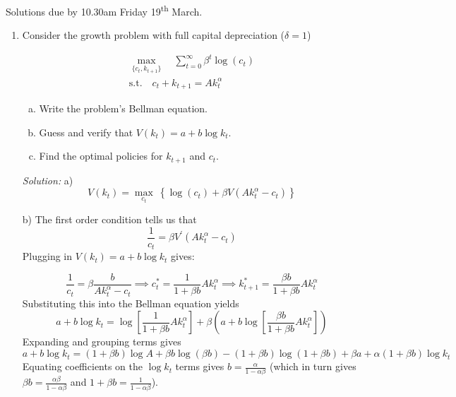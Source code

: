 \documentclass[12pt]{article}
\newif\ifsln
\begin{document}
\pagestyle{fancyplain}


\chead{\textbf{Tutorial 6 \ifsln Solutions \fi}}

\begin{center}
Solutions due by 10.30am Friday 19\textsuperscript{th} March.
\end{center}

\begin{enumerate}[1.]
\setlength\itemsep{5mm}
\item Consider the growth problem with full capital depreciation ($\delta = 1$)

\begin{gather*}
\underset{\{c_{t}, k_{t+1}\}}{\max} \quad \sum_{t=0}^{\infty} \beta^{t} \log(c_{t})\\
\text{s.t.} \quad c_{t} + k_{t+1} = Ak_{t}^{\alpha}
\end{gather*}

\begin{enumerate}[a)]
\item Write the problem's Bellman equation.

\item Guess and verify that $V(k_{t}) = a + b \log k_{t}$.

\item Find the optimal policies for $k_{t+1}$ and $c_{t}$.
\end{enumerate}

\ifsln
\textit{Solution:}
a) \[V(k_{t}) = \underset{c_{t}}{\max} \ \left\{  \log(c_{t}) + \beta V(Ak_{t}^{\alpha} - c_{t})   \right\}\]
\bigskip

b) The first order condition tells us that 
\[\frac{1}{c_{t}} = \beta V^{\prime}(Ak_{t}^{\alpha} - c_{t})\]
Plugging in $V(k_{t}) = a + b \log k_{t}$ gives:

\[\frac{1}{c_{t}} = \beta\frac{b}{Ak_{t}^{\alpha} - c_{t}} \implies c_{t}^{*} = \frac{1}{1 + \beta b} Ak_{t}^{\alpha} \implies k_{t+1}^{*} = \frac{\beta b}{1+\beta b}Ak_{t}^{\alpha}\]
Substituting this into the Bellman equation yields
\[a + b \log k_{t} = \log \left[ \frac{1}{1 + \beta b} Ak_{t}^{\alpha} \right]  + \beta \left(a + b\log\left[  \frac{\beta b}{1+\beta b}Ak_{t}^{\alpha} \right] \right)\]
Expanding and grouping terms gives 
\[a + b\log k_{t} = (1+\beta b)\log A + \beta b \log (\beta b) - (1+ \beta b)\log(1+\beta b) + \beta a + \alpha(1+\beta b)\log k_{t}\]
Equating coefficients on the $\log k_{t}$ terms gives $b = \frac{\alpha}{1-\alpha \beta}$ (which in turn gives $\beta b = \frac{\alpha\beta}{1-\alpha \beta}$ and $1 + \beta b = \frac{1}{1-\alpha \beta}$).\bigskip


\end{enumerate}
\end{document}
